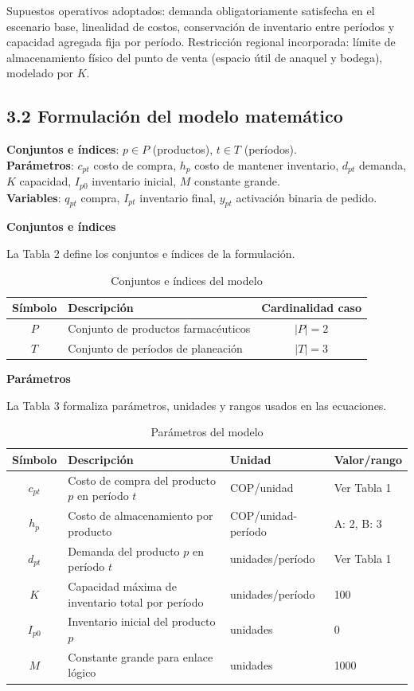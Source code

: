 \documentclass[12pt,letterpaper]{article}
\begin{document}
Supuestos operativos adoptados: demanda obligatoriamente satisfecha en el escenario base, linealidad de costos, conservación de inventario entre períodos y capacidad agregada fija por período. Restricción regional incorporada: límite de almacenamiento físico del punto de venta (espacio útil de anaquel y bodega), modelado por $K$.

\subsection{3.2 Formulación del modelo matemático}
\textbf{Conjuntos e índices}: $p \in P$ (productos), $t \in T$ (períodos). \\
\textbf{Parámetros}: $c_{pt}$ costo de compra, $h_p$ costo de mantener inventario, $d_{pt}$ demanda, $K$ capacidad, $I_{p0}$ inventario inicial, $M$ constante grande. \\
\textbf{Variables}: $q_{pt}$ compra, $I_{pt}$ inventario final, $y_{pt}$ activación binaria de pedido.

\vspace{0.2cm}
\textbf{Conjuntos e índices}

La Tabla 2 define los conjuntos e índices de la formulación.
\begin{table}[H]
\centering
\caption{Conjuntos e índices del modelo}
\begin{tabular}{|c|p{8cm}|c|}
\hline
\textbf{Símbolo} & \textbf{Descripción} & \textbf{Cardinalidad caso} \\
\hline
$P$ & Conjunto de productos farmacéuticos & $|P|=2$ \\
\hline
$T$ & Conjunto de períodos de planeación & $|T|=3$ \\
\hline
\end{tabular}
\end{table}

\textbf{Parámetros}

La Tabla 3 formaliza parámetros, unidades y rangos usados en las ecuaciones.
\begin{table}[H]
\centering
\caption{Parámetros del modelo}
\begin{tabular}{|c|p{5.7cm}|p{2.5cm}|p{2.3cm}|}
\hline
\textbf{Símbolo} & \textbf{Descripción} & \textbf{Unidad} & \textbf{Valor/rango} \\
\hline
$c_{pt}$ & Costo de compra del producto $p$ en período $t$ & COP/unidad & Ver Tabla 1 \\
\hline
$h_p$ & Costo de almacenamiento por producto & COP/unidad-período & A: 2, B: 3 \\
\hline
$d_{pt}$ & Demanda del producto $p$ en período $t$ & unidades/período & Ver Tabla 1 \\
\hline
$K$ & Capacidad máxima de inventario total por período & unidades/período & 100 \\
\hline
$I_{p0}$ & Inventario inicial del producto $p$ & unidades & 0 \\
\hline
$M$ & Constante grande para enlace lógico & unidades & 1000 \\
\hline
\end{tabular}
\end{table}
\end{document}
